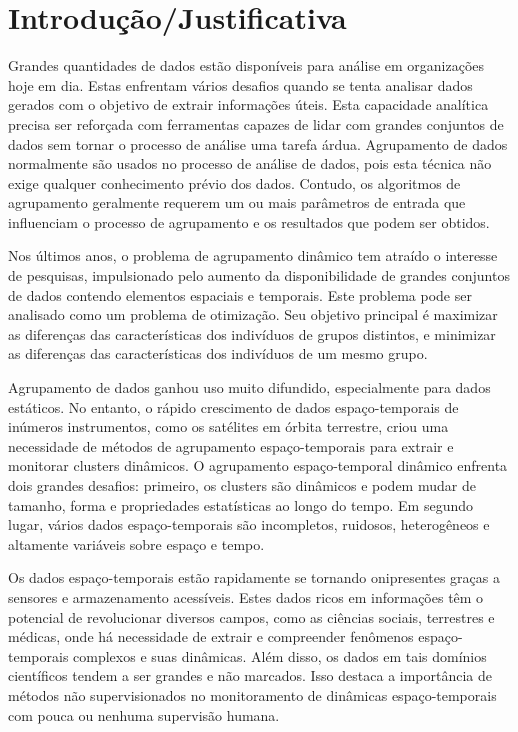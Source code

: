\chapter{Introdução/Justificativa}
\label{cap:introducao}

Grandes quantidades de dados estão disponíveis para análise em organizações hoje em dia.
Estas enfrentam vários desafios quando se tenta analisar dados gerados com o objetivo de
extrair informações úteis.
Esta capacidade analítica precisa ser reforçada com ferramentas capazes de lidar com
grandes conjuntos de dados sem tornar o processo de análise uma tarefa árdua.
Agrupamento de dados normalmente são usados no processo de análise de dados, pois esta técnica
não exige qualquer conhecimento prévio dos dados. Contudo, os algoritmos de agrupamento
geralmente requerem um ou mais parâmetros de entrada que influenciam o processo de
agrupamento e os resultados que podem ser obtidos. 

Nos últimos anos, o problema de agrupamento dinâmico tem atraído o interesse de pesquisas,
impulsionado pelo aumento da disponibilidade de grandes conjuntos de dados contendo
elementos espaciais e temporais. Este problema pode ser analisado como um problema de
otimização. Seu objetivo principal é maximizar as diferenças das características dos
indivíduos de grupos distintos, e minimizar as diferenças das características dos
indivíduos de um mesmo grupo.


Agrupamento de dados ganhou uso muito difundido, especialmente para dados estáticos.
No entanto, o rápido crescimento de dados espaço-temporais de inúmeros instrumentos,
como os satélites em órbita terrestre, criou uma necessidade de métodos de agrupamento
espaço-temporais para extrair e monitorar clusters dinâmicos. O agrupamento espaço-temporal
dinâmico enfrenta dois grandes desafios: primeiro, os clusters são dinâmicos e podem mudar de
tamanho, forma e propriedades estatísticas ao longo do tempo. Em segundo lugar, vários dados
espaço-temporais são incompletos, ruidosos, heterogêneos e altamente variáveis sobre espaço e tempo.

Os dados espaço-temporais estão rapidamente se tornando onipresentes graças a sensores e armazenamento acessíveis. Estes dados ricos em informações têm o potencial de revolucionar diversos campos, como as ciências sociais, terrestres e médicas, onde há necessidade de extrair e compreender fenômenos espaço-temporais complexos e suas dinâmicas. Além disso, os dados em tais domínios científicos tendem a ser grandes e não marcados. Isso destaca a importância de métodos não supervisionados no monitoramento de dinâmicas espaço-temporais com pouca ou nenhuma supervisão humana.

